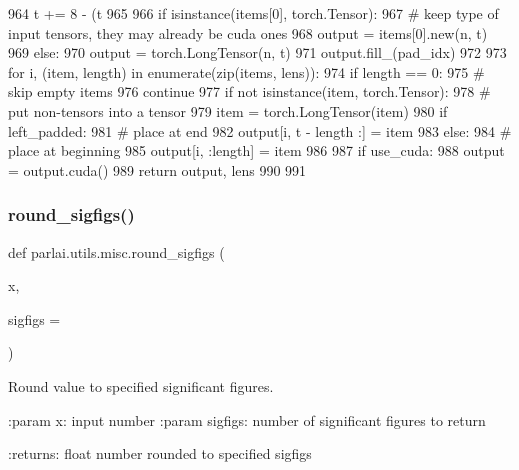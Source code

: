 \begin{DoxyCode}
964         t += 8 - (t %
965 
966     \textcolor{keywordflow}{if} isinstance(items[0], torch.Tensor):
967         \textcolor{comment}{# keep type of input tensors, they may already be cuda ones}
968         output = items[0].new(n, t)
969     \textcolor{keywordflow}{else}:
970         output = torch.LongTensor(n, t)
971     output.fill\_(pad\_idx)
972 
973     \textcolor{keywordflow}{for} i, (item, length) \textcolor{keywordflow}{in} enumerate(zip(items, lens)):
974         \textcolor{keywordflow}{if} length == 0:
975             \textcolor{comment}{# skip empty items}
976             \textcolor{keywordflow}{continue}
977         \textcolor{keywordflow}{if} \textcolor{keywordflow}{not} isinstance(item, torch.Tensor):
978             \textcolor{comment}{# put non-tensors into a tensor}
979             item = torch.LongTensor(item)
980         \textcolor{keywordflow}{if} left\_padded:
981             \textcolor{comment}{# place at end}
982             output[i, t - length :] = item
983         \textcolor{keywordflow}{else}:
984             \textcolor{comment}{# place at beginning}
985             output[i, :length] = item
986 
987     \textcolor{keywordflow}{if} use\_cuda:
988         output = output.cuda()
989     \textcolor{keywordflow}{return} output, lens
990 
991 
\end{DoxyCode}
\mbox{\label{namespaceparlai_1_1utils_1_1misc_af245c261b10f36175f6d88fce852c552}} 
\subsubsection{\texorpdfstring{round\+\_\+sigfigs()}{round\_sigfigs()}}
{\footnotesize\ttfamily def parlai.\+utils.\+misc.\+round\+\_\+sigfigs (\begin{DoxyParamCaption}\item[{}]{x,  }\item[{}]{sigfigs = {} }\end{DoxyParamCaption})}

\begin{DoxyVerb}Round value to specified significant figures.

:param x: input number
:param sigfigs: number of significant figures to return

:returns: float number rounded to specified sigfigs
\end{DoxyVerb}
 

